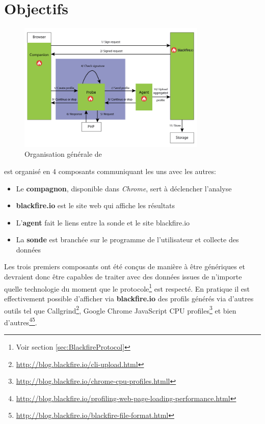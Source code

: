 
\chapter{Objectifs}
	\setcounter{chapter}{2}
	
\begin{figure}[!h]
\begin{center}
  \includegraphics[width=0.8\textwidth]{images/schemas/workflow/general-workflow}
  \caption{Organisation générale de \Blackfire}
\end{center}
\end{figure}

\Blackfire est organisé en 4 composants communiquant les uns avec les autres:
\begin{itemize}
\item Le \textbf{compagnon}, disponible dans \emph{Chrome}, sert à déclencher l'analyse
\item \textbf{blackfire.io} est le site web qui affiche les résultats
\item L'\textbf{agent} fait le liens entre la sonde et le site blackfire.io
\item La \textbf{sonde} est branchée sur le programme de l'utilisateur et collecte des données
\end{itemize}

Les trois premiers composants ont été conçus de manière à être génériques et devraient donc être capables de traiter avec des données issues de n'importe quelle technologie du moment que le protocole\footnote{Voir section \vref{sec:BlackfireProtocol}} est respecté. En pratique il est effectivement possible d'afficher via \textbf{blackfire.io} des profils générés via d'autres outils tel que Callgrind\footnote{\url{http://blog.blackfire.io/cli-upload.html}}, Google Chrome JavaScript CPU profiles\footnote{\url{http://blog.blackfire.io/chrome-cpu-profiles.htmll}} et bien d'autres\footnote{\url{http://blog.blackfire.io/profiling-web-page-loading-performance.html}}\footnote{\url{http://blog.blackfire.io/blackfire-file-format.html}}.

